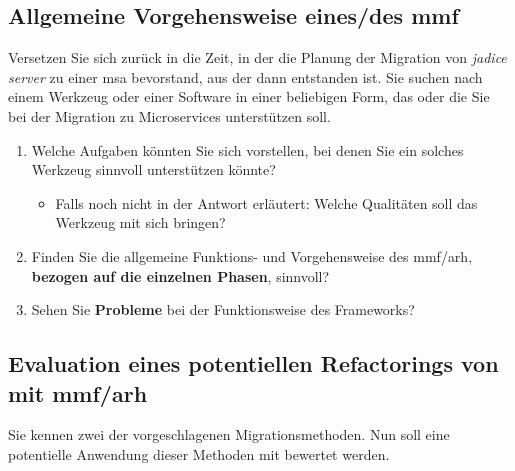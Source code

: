 \subsection{Allgemeine Vorgehensweise eines/des \gls{mmf}}

Versetzen Sie sich zurück in die Zeit, in der die Planung der Migration von \emph{jadice server} zu einer \acrlong{msa} bevorstand, aus der dann \jf entstanden ist.
Sie suchen nach einem Werkzeug oder einer Software in einer beliebigen Form, das oder die Sie bei der Migration zu Microservices unterstützen soll.

\begin{enumerate}
	\item Welche Aufgaben könnten Sie sich vorstellen, bei denen Sie ein solches Werkzeug sinnvoll unterstützen könnte?
	\begin{itemize}
		\item Falls noch nicht in der Antwort erläutert: Welche Qualitäten soll das Werkzeug mit sich bringen?
	\end{itemize}
	\item Finden Sie die allgemeine Funktions- und Vorgehensweise des \gls{mmf}/\gls{arh}, \textbf{bezogen auf die einzelnen Phasen}, sinnvoll? 
	\item Sehen Sie \textbf{Probleme} bei der Funktionsweise des Frameworks?
\end{enumerate}

\subsection{Evaluation eines potentiellen Refactorings von \jf mit \gls{mmf}/\gls{arh}}

Sie kennen zwei der vorgeschlagenen Migrationsmethoden.
Nun soll eine potentielle Anwendung dieser Methoden mit \jf bewertet werden.

